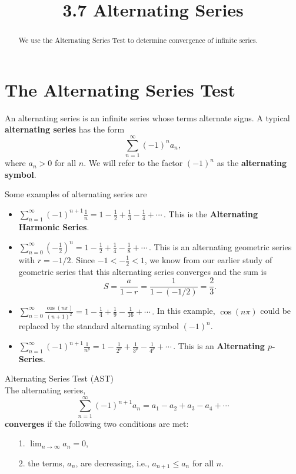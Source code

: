 \documentclass{ximera}
\title{3.7 Alternating Series}
\begin{document}
\begin{abstract}
We use the Alternating Series Test to determine convergence of infinite series.
\end{abstract}

\maketitle

\section{The Alternating Series Test}

An alternating series is an infinite series whose terms alternate signs.
A typical \textbf{alternating series} has the form 
\[
\sum_{n=1}^\infty (-1)^n a_n,
\]
where $a_n > 0$ for all $n$. We will refer to the factor $(-1)^n$ as the \textbf{alternating symbol}.

Some examples of alternating series are
\begin{itemize}

\item $\displaystyle{\sum_{n=1}^\infty (-1)^{n+1} \frac{1}{n} = 1 - \frac12 + \frac13 - \frac14 + \cdots  }\, .$  This is the \textbf{Alternating Harmonic Series}.

\item $\displaystyle{\sum_{n=0}^\infty \left(-\frac12\right)^n = 1 - \frac12 + \frac14 - \frac18 + \cdots }\, .$  This is an alternating geometric series with $r=-1/2$.
Since $-1 < -\frac12 < 1$, we know from our earlier study of geometric series that this alternating series converges and 
the sum is 
\[
S = \frac{a}{1-r} = \frac{1}{1-(-1/2)} = \frac23.
\]

\item $\displaystyle{\sum_{n=0}^\infty \frac{\cos(n\pi)}{(n+1)^2} = 1 - \frac14 + \frac19 - \frac{1}{16} + \cdots}\, .$ 
In this example, $\cos(n\pi)$ could be replaced by the standard alternating symbol $(-1)^n$.


\item $\displaystyle{\sum_{n=1}^\infty (-1)^{n+1} \frac{1}{n^p} = 1 - \frac{1}{2^p} + \frac{1}{3^p} - \frac{1}{4^p} + \cdots  }\, .$  This is an \textbf{Alternating $p$-Series}.


\end{itemize}

\begin{theorem} Alternating Series Test (AST)\\
The alternating series, 
\[
\sum_{n=1}^\infty (-1)^{n+1} a_n = a_1 - a_2 + a_3 - a_4 + \cdots
\]
\textbf{converges} if the following two conditions are met:
\begin{itemize}
\item[1.] $\displaystyle{\lim_{n\to\infty} a_n = 0}$,
\item[2.] the terms, $a_n$, are decreasing, i.e., $a_{n+1} \leq a_n$ for all $n$.
\end{itemize}
\end{theorem}
\end{document}

